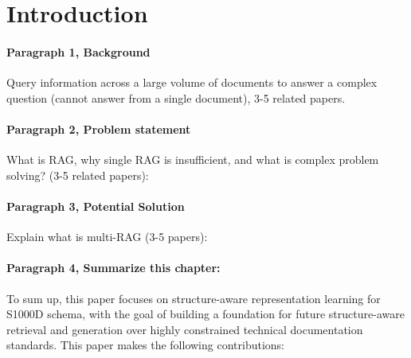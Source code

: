 \section{Introduction}



\paragraph{Paragraph 1, Background} 

Query information across a large volume of documents to answer a complex question (cannot answer from a single document), 3-5 related papers.

\paragraph{Paragraph 2, Problem statement} 

What is RAG, why single RAG is insufficient, and what is complex problem solving? (3-5 related papers):

\paragraph{Paragraph 3, Potential Solution} 

Explain what is multi-RAG (3-5 papers):

\paragraph{Paragraph 4, Summarize this chapter:} 
To sum up, this paper focuses on structure-aware representation learning for S1000D schema, with the goal of building a foundation for future structure-aware retrieval and generation over highly constrained technical documentation standards. This paper makes the following contributions:

